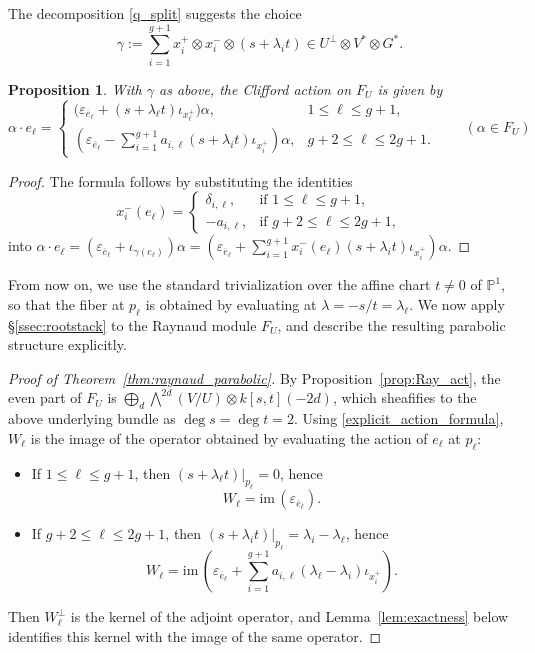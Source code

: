 \documentclass[12pt, letterpaper]{amsart}
\newtheorem{proposition}[theorem]{Proposition}
\theoremstyle{definition}
\newcommand{\PP}{\mathbb{P} }
\newcommand{\ga}{\gamma}
\newcommand{\lbd}{\lambda}
\def\im{\mathrm{im}\, }
\begin{document}
The decomposition \eqref{q_split} suggests the choice
\begin{equation*}
\ga:=\sum_{i=1}^{g+1}x_i^+\otimes x_i^-\otimes(s+\lbd_i t)\in U^\perp\otimes V^*\otimes G^*.
\end{equation*}

\begin{proposition}\label{prop:explicit_action}
With \(\ga\) as above, the Clifford action on \(F_U\) is given by
\begin{equation}\label{explicit_action_formula}
\alpha\cdot e_\ell= \begin{cases}
  \bigl(\varepsilon_{\overline e_\ell}+(s+\lbd_\ell t)\iota_{x_\ell^+}\bigr)\alpha, & 1\le\ell\le g+1,\\[4pt]
  \left(\varepsilon_{\overline e_\ell}-\sum_{i=1}^{g+1}a_{i,\ell}(s+\lbd_i t)\iota_{x_i^+}\right)\alpha, & g+2\le\ell\le 2g+1.
\end{cases}\qquad(\alpha\in F_U)
\end{equation}
\end{proposition}

\begin{proof}
The formula follows by substituting the identities
\[x_i^-(e_\ell)=\begin{cases} \delta_{i,\ell},&\text{if }1\le\ell\le g+1,\\ -a_{i,\ell},&\text{if }g+2\le\ell\le 2g+1, \end{cases}\]
into \(\alpha\cdot e_\ell=(\varepsilon_{\overline e_\ell}+\iota_{\ga(e_\ell)})\alpha=(\varepsilon_{\overline e_\ell}+\sum_{i=1}^{g+1}x_i^-(e_\ell)(s+\lbd_it)\iota_{x_i^+})\alpha\).
\end{proof}

From now on, we use the standard trivialization over the affine chart \(t\ne0\) of \(\PP^1\), so that the fiber at \(p_\ell\) is obtained by evaluating at \(\lbd=-s/t=\lbd_\ell\). We now apply \S\ref{ssec:rootstack} to the Raynaud module \(F_U\), and describe the resulting parabolic structure explicitly.

\begin{proof}[Proof of Theorem~\ref{thm:raynaud_parabolic}]
By Proposition~\ref{prop:Ray_act}, the even part of \(F_U\) is \(\bigoplus_d\bigwedge^{2d}(V/U)\otimes k[s,t](-2d)\), which sheafifies to the above underlying bundle as \(\deg s=\deg t=2\). Using \eqref{explicit_action_formula}, \(W_\ell\) is the image of the operator obtained by evaluating the action of \(e_\ell\) at \(p_\ell\):
\begin{itemize}
  \item If \(1\le\ell\le g+1\), then \((s+\lbd_\ell t)|_{p_\ell}=0\), hence
  \[W_\ell=\im(\varepsilon_{\overline e_\ell}).\]
  \item If \(g+2\le\ell\le 2g+1\), then \((s+\lbd_i t)|_{p_\ell}=\lbd_i-\lbd_\ell\), hence
  \[W_\ell=\im\!\left(\varepsilon_{\overline e_\ell}+\sum_{i=1}^{g+1}a_{i,\ell}(\lbd_\ell-\lbd_i)\iota_{x_i^+}\right).\]
\end{itemize}
Then \(W_\ell^\perp\) is the kernel of the adjoint operator, and Lemma~\ref{lem:exactness} below identifies this kernel with the image of the same operator.
\end{proof}
\end{document}

